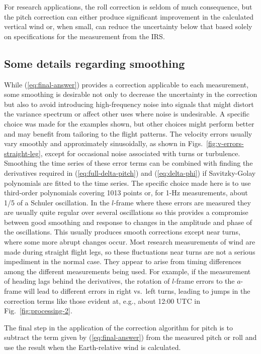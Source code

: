 \documentclass[english,british,amtd,bookmarks=false,unicode=true]{copernicus}\usepackage[]{graphicx}\usepackage[]{color}
\begin{document}
For research applications, the roll correction is seldom of much consequence,
but the pitch correction can either produce significant improvement
in the calculated vertical wind or, when small, can reduce the uncertainty
below that based solely on specifications for the measurement from
the IRS. 




\subsection{Some details regarding smoothing}

While (\ref{eq:final-answer}) provides a correction applicable to
each measurement, some smoothing is desirable not only to decrease
the uncertainty in the correction but also to avoid introducing high-frequency
noise into signals that might distort the variance spectrum or affect
other uses where noise is undesirable. A specific choice was made
for the examples shown, but other choices might perform better and
may benefit from tailoring to the flight patterns. The velocity errors
usually vary smoothly and approximately sinusoidally, as shown in
Figs.~\ref{fig:v-errors-straight-leg}, except for occasional noise
associated with turns or turbulence. Smoothing the time series of
these error terms can be combined with finding the derivatives required
in (\ref{eq:full-delta-pitch}) and (\ref{eq:delta-phi}) if Savitzky-Golay
polynomials are fitted to the time series. The specific choice made
here is to use third-order polynomials covering 1013 points or, for
1-Hz measurements, about 1/5 of a Schuler oscillation. In the $l$-frame
where these errors are measured they are usually quite regular over
several oscillations so this provides a compromise between good smoothing
and response to changes in the amplitude and phase of the oscillations.
This usually produces smooth corrections except near turns, where
some more abrupt changes occur. Most research measurements of wind
are made during straight flight legs, so these fluctuations near turns
are not a serious impediment in the normal case. They appear to arise
from timing differences among the different measurements being used.
For example, if the measurement of heading lags behind the derivatives,
the rotation of $l$-frame errors to the $a$-frame will lead to different
errors in right vs.~left turns, leading to jumps in the correction
terms like those evident at, e.g., about 12:00 UTC in Fig.~\ref{fig:processing-2}.

The final step in the application of the correction algorithm for
pitch is to subtract the term given by (\ref{eq:final-answer}) from
the measured pitch or roll and use the result when the Earth-relative
wind is calculated. 
\end{document}
